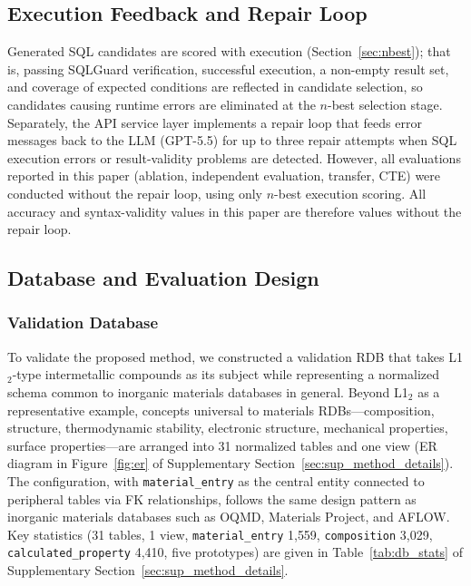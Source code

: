 \subsection{Execution Feedback and Repair Loop}
\label{sec:repair}

Generated SQL candidates are scored with execution (Section~\ref{sec:nbest}); that is, passing SQLGuard verification, successful execution, a non-empty result set, and coverage of expected conditions are reflected in candidate selection, so candidates causing runtime errors are eliminated at the $n$-best selection stage. Separately, the API service layer implements a repair loop that feeds error messages back to the LLM (GPT-5.5) for up to three repair attempts when SQL execution errors or result-validity problems are detected. However, all evaluations reported in this paper (ablation, independent evaluation, transfer, CTE) were conducted without the repair loop, using only $n$-best execution scoring. All accuracy and syntax-validity values in this paper are therefore values without the repair loop.
\subsection{Database and Evaluation Design}
\label{sec:evaluation}
\subsubsection{Validation Database}

To validate the proposed method, we constructed a validation RDB that takes L1$_2$-type intermetallic compounds as its subject while representing a normalized schema common to inorganic materials databases in general. Beyond L1$_2$ as a representative example, concepts universal to materials RDBs---composition, structure, thermodynamic stability, electronic structure, mechanical properties, surface properties---are arranged into 31 normalized tables and one view (ER diagram in Figure~\ref{fig:er} of Supplementary Section~\ref{sec:sup_method_details}). The configuration, with \texttt{material\_entry} as the central entity connected to peripheral tables via FK relationships, follows the same design pattern as inorganic materials databases such as OQMD, Materials Project, and AFLOW. Key statistics (31 tables, 1 view, \texttt{material\_entry} 1{,}559, \texttt{composition} 3{,}029, \texttt{calculated\_property} 4{,}410, five prototypes) are given in Table~\ref{tab:db_stats} of Supplementary Section~\ref{sec:sup_method_details}.

